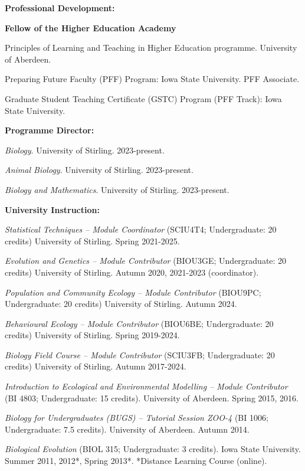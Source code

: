 \documentclass[letterpaper]{article}
\renewenvironment{itemize}{
  \begin{list}{}{
    \setlength{\leftmargin}{1.5em}
  }
}{
  \end{list}
}
\begin{document}
\begin{itemize}
\item {\bf Professional Development:}
\begin{itemize}
\item[$\bullet$]{{\bf Fellow of the Higher Education Academy}}
\item[$\bullet$]{Principles of Learning and Teaching in Higher Education programme. University of Aberdeen.}
\item[$\bullet$]{Preparing Future Faculty (PFF) Program: Iowa State University. PFF Associate.}
\item[$\bullet$]{Graduate Student Teaching Certificate (GSTC) Program (PFF Track): Iowa State University.}
\end{itemize}

\item {\bf Programme Director:}
\begin{itemize}
\item[$\bullet$]{{\it Biology}. University of Stirling. 2023-present.}
\item[$\bullet$]{{\it Animal Biology}. University of Stirling. 2023-present.}
\item[$\bullet$]{{\it Biology and Mathematics}. University of Stirling. 2023-present.}
\end{itemize}

\item {\bf University Instruction:}
\begin{itemize}
\item[$\bullet$]{{\it Statistical Techniques -- Module Coordinator} (SCIU4T4; Undergraduate: 20 credits) University of Stirling. Spring 2021-2025.}
\item[$\bullet$]{{\it Evolution and Genetics -- Module Contributor} (BIOU3GE; Undergraduate: 20 credits) University of Stirling. Autumn 2020, 2021-2023 (coordinator).}
\item[$\bullet$]{{\it Population and Community Ecology -- Module Contributor} (BIOU9PC; Undergraduate: 20 credits) University of Stirling. Autumn 2024.}
\item[$\bullet$]{{\it Behavioural Ecology -- Module Contributor} (BIOU6BE; Undergraduate: 20 credits) University of Stirling. Spring 2019-2024.}
\item[$\bullet$]{{\it Biology Field Course -- Module Contributor} (SCIU3FB; Undergraduate: 20 credits) University of Stirling. Autumn 2017-2024.}
\item[$\bullet$]{{\it Introduction to Ecological and Environmental Modelling -- Module Contributor} (BI 4803; Undergraduate: 15 credits). University of Aberdeen. Spring 2015, 2016.}
\item[$\bullet$]{{\it Biology for Undergraduates (BUGS) -- Tutorial Session ZOO-4} (BI 1006; Undergraduate: 7.5 credits). University of Aberdeen. Autumn 2014.}
\item[$\bullet$]{{\it Biological Evolution} (BIOL 315; Undergraduate: 3 credits). Iowa State University. Summer 2011, 2012*, Spring 2013*. *Distance Learning Course (online).}
\end{itemize}


\end{itemize}
\end{document}
